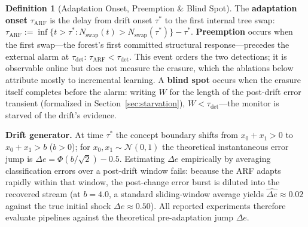\documentclass[10pt,conference]{IEEEtran}
\theoremstyle{definition}
\newtheorem{definition}{Definition}
\begin{document}
\begin{definition}[Adaptation Onset, Preemption \& Blind Spot]\label{def:tau_arf}
  The \textbf{adaptation onset} $\tau_{\mathrm{ARF}}$ is the delay from drift onset $\tau^*$ to the first internal tree swap: $\tau_{\mathrm{ARF}} := \inf\bigl\{t > \tau^* : N_{\mathrm{swap}}(t) > N_{\mathrm{swap}}(\tau^*) \bigr\} - \tau^*$.
  \textbf{Preemption} occurs when the first swap---the forest's first committed structural response---precedes the external alarm at $\tau_{\mathrm{det}}$: $\tau_{\mathrm{ARF}} < \tau_{\mathrm{det}}$. This event orders the two detections; it is observable online but does not measure the erasure, which the ablations below attribute mostly to incremental learning.
  A \textbf{blind spot} occurs when the erasure itself completes before the alarm: writing $W$ for the length of the post-drift error transient (formalized in Section~\ref{sec:starvation}), $W < \tau_{\mathrm{det}}$---the monitor is starved of the drift's evidence.
\end{definition}

\noindent\textbf{Drift generator.}
At time $\tau^*$ the concept boundary shifts from $x_0 + x_1 > 0$ to $x_0 + x_1 > b$ ($b > 0$); for $x_0, x_1 \sim \mathcal{N}(0,1)$ the theoretical instantaneous error jump is $\Delta e = \Phi(b/\sqrt{2}) - 0.5$. Estimating $\Delta e$ empirically by averaging classification errors over a post-drift window fails: because the ARF adapts rapidly within that window, the post-change error burst is diluted into the recovered stream (at $b = 4.0$, a standard sliding-window average yields $\widehat{\Delta e} \approx 0.02$ against the true initial shock $\Delta e \approx 0.50$). All reported experiments therefore evaluate pipelines against the theoretical pre-adaptation jump $\Delta e$.
\end{document}
